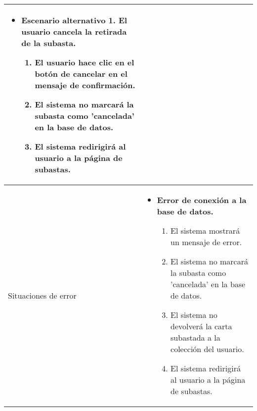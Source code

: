 \begin{longtable}{
    >{\columncolor{lightgreen!20}}p{4cm}
    p{12cm}
    }
\begin{itemize}[nosep,leftmargin=*]
        \item \textbf{Escenario alternativo 1. El usuario cancela la retirada de la subasta.}
        \begin{enumerate}[nosep,leftmargin=*]
            \item El usuario hace clic en el botón de cancelar en el mensaje de confirmación.
            \item El sistema no marcará la subasta como 'cancelada' en la base de datos.
            \item El sistema redirigirá al usuario a la página de subastas.
        \end{enumerate}
    \end{itemize} \\
    \midrule
    Situaciones de error & 
    \begin{itemize}[nosep,leftmargin=*]
        \item \textbf{Error de conexión a la base de datos.}
        \begin{enumerate}[nosep,leftmargin=*]
            \item El sistema mostrará un mensaje de error.
            \item El sistema no marcará la subasta como 'cancelada' en la base de datos.
            \item El sistema no devolverá la carta subastada a la colección del usuario.
            \item El sistema redirigirá al usuario a la página de subastas.
        \end{enumerate}
    \end{itemize} \\
\end{longtable}